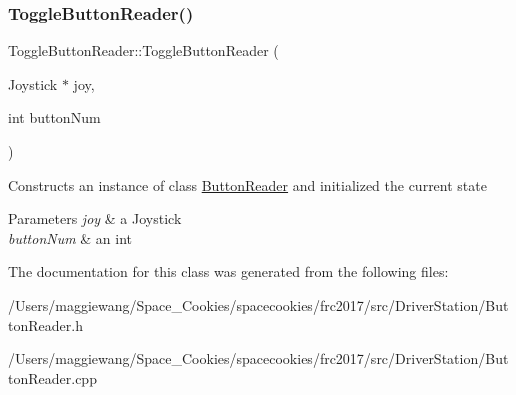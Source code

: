 \subsubsection{\texorpdfstring{Toggle\+Button\+Reader()}{ToggleButtonReader()}}
{\footnotesize\ttfamily Toggle\+Button\+Reader\+::\+Toggle\+Button\+Reader (\begin{DoxyParamCaption}\item[{Joystick $\ast$}]{joy,  }\item[{int}]{button\+Num }\end{DoxyParamCaption})}

Constructs an instance of class \hyperlink{class_button_reader}{Button\+Reader} and initialized the current state 
\begin{DoxyParams}{Parameters}
{\em joy} & a Joystick \\
\hline
{\em button\+Num} & an int \\
\hline
\end{DoxyParams}


The documentation for this class was generated from the following files\+:\begin{DoxyCompactItemize}
\item 
/\+Users/maggiewang/\+Space\+\_\+\+Cookies/spacecookies/frc2017/src/\+Driver\+Station/Button\+Reader.\+h\item 
/\+Users/maggiewang/\+Space\+\_\+\+Cookies/spacecookies/frc2017/src/\+Driver\+Station/Button\+Reader.\+cpp\end{DoxyCompactItemize}

